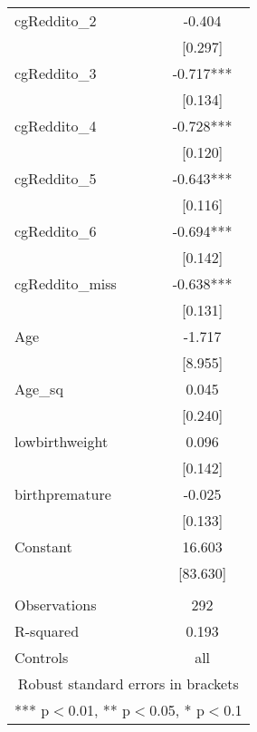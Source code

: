 \documentclass[]{article}
\begin{document}
\begin{tabular}{lc}
cgReddito\_2 & -0.404 \\
 & [0.297] \\
cgReddito\_3 & -0.717*** \\
 & [0.134] \\
cgReddito\_4 & -0.728*** \\
 & [0.120] \\
cgReddito\_5 & -0.643*** \\
 & [0.116] \\
cgReddito\_6 & -0.694*** \\
 & [0.142] \\
cgReddito\_miss & -0.638*** \\
 & [0.131] \\
Age & -1.717 \\
 & [8.955] \\
Age\_sq & 0.045 \\
 & [0.240] \\
lowbirthweight & 0.096 \\
 & [0.142] \\
birthpremature & -0.025 \\
 & [0.133] \\
Constant & 16.603 \\
 & [83.630] \\
 &  \\
Observations & 292 \\
R-squared & 0.193 \\
 Controls & all \\ \hline
\multicolumn{2}{c}{ Robust standard errors in brackets} \\
\multicolumn{2}{c}{ *** p$<$0.01, ** p$<$0.05, * p$<$0.1} \\
\end{tabular}
\end{document}
